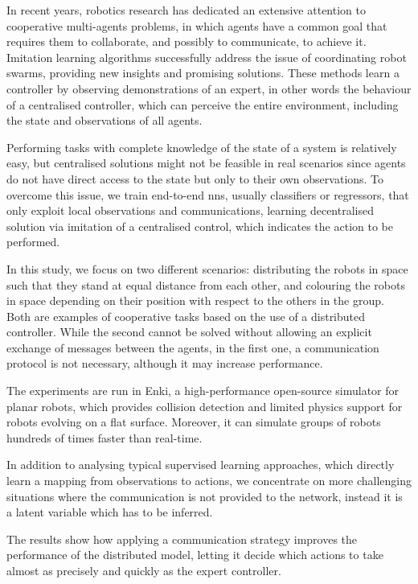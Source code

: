 In recent years, robotics research has dedicated an extensive attention to 
cooperative multi-agents problems, in which agents have a common goal that 
requires them to collaborate, and possibly to communicate, to achieve it.
Imitation learning algorithms successfully address the issue of coordinating robot 
swarms, providing new insights and promising solutions. 
These methods learn a controller by observing demonstrations of an expert, in 
other words the behaviour of a centralised controller, which can perceive the 
entire environment, including the state and observations of all agents. 

Performing tasks with complete knowledge of the state of a system is relatively 
easy, but centralised solutions might not be feasible in real scenarios since agents 
do not have direct access to the state but only to their own observations.
To overcome this issue, we train end-to-end \glspl{nn}, usually classifiers or 
regressors, that only exploit local observations and communications, learning 
decentralised solution via imitation of a centralised control, which indicates the 
action to be performed.

In this study, we focus on two different scenarios: distributing the robots in space 
such that they stand at equal distance from each other, and colouring the robots 
in space depending on their position with respect to the others in the group.
Both are examples of cooperative tasks based on the use of a distributed 
controller. While the second cannot be solved without allowing an explicit 
exchange of messages between the agents, in the first one, a communication 
protocol is not necessary, although it may increase performance.

The experiments are run in Enki, a high-performance open-source simulator for 
planar robots, which provides collision detection and limited physics support for 
robots evolving on a flat surface. Moreover, it can simulate groups of robots 
hundreds of times faster than real-time.

In addition to analysing typical supervised learning approaches, which directly 
learn a mapping from observations to actions, we concentrate on more 
challenging situations where the communication is not provided to the network, 
instead it is a latent variable which has to be inferred.

The results show how applying a communication strategy improves the 
performance of the distributed model, letting it decide which actions to take 
almost as precisely and quickly as the expert controller.